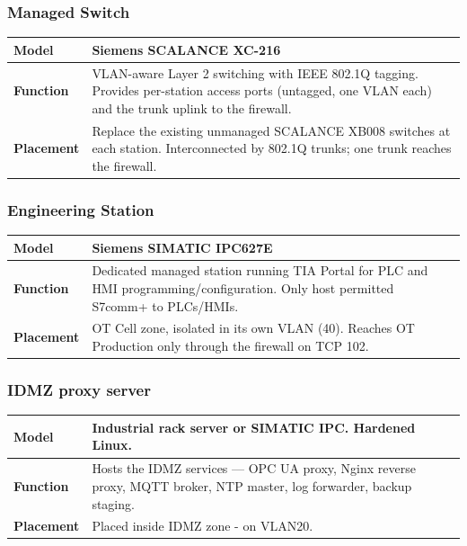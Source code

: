 \documentclass[11pt,a4paper]{article}
\renewcommand{\arraystretch}{1.15}
\begin{document}
\subsubsection{Managed Switch}
\renewcommand{\arraystretch}{1.3} %
\begin{tabularx}{\textwidth}{>{\bfseries}p{2.5cm} X}
    \toprule
    Model & Siemens SCALANCE XC-216  \\
    \midrule
    Function & VLAN-aware Layer 2 switching with IEEE 802.1Q tagging. Provides
    per-station access ports (untagged, one VLAN each) and the trunk uplink to
    the firewall. \\
    \midrule
    Placement & Replace the existing unmanaged SCALANCE XB008 switches at each
    station. Interconnected by 802.1Q trunks; one trunk reaches the firewall.
    \\
    \midrule
\end{tabularx}

\subsubsection{Engineering Station}
\renewcommand{\arraystretch}{1.3} %
\begin{tabularx}{\textwidth}{>{\bfseries}p{2.5cm} X}
    \toprule
    Model & Siemens SIMATIC IPC627E\\
    \midrule
    Function & Dedicated managed station running TIA Portal for PLC and HMI
    programming/configuration. Only host permitted S7comm+ to PLCs/HMIs.\\
    \midrule
    Placement & OT Cell zone, isolated in its own VLAN (40). Reaches OT
    Production only through the firewall on TCP 102.\\
    \midrule
\end{tabularx}

\subsubsection{IDMZ proxy server}
\renewcommand{\arraystretch}{1.3} %
\begin{tabularx}{\textwidth}{>{\bfseries}p{2.5cm} X}
    \toprule
    Model & Industrial rack server or SIMATIC IPC. Hardened Linux.\\
    \midrule
    Function & Hosts the IDMZ services — OPC UA proxy, Nginx reverse proxy,
    MQTT broker, NTP master, log forwarder, backup staging. \\
    \midrule
    Placement & Placed inside IDMZ zone - on VLAN20. \\
    \midrule
\end{tabularx}
\end{document}
